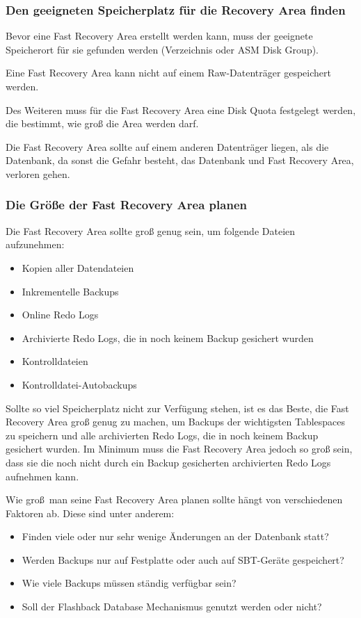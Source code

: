         \subsubsection{Den geeigneten Speicherplatz für die Recovery Area finden}
          Bevor eine Fast Recovery Area erstellt werden kann, muss der geeignete
          Speicherort für sie gefunden werden (Verzeichnis oder ASM Disk
          Group).
\clearpage
          \begin{merke}
            Eine Fast Recovery Area kann nicht auf einem Raw-Datenträger gespeichert werden.
          \end{merke}
          Des Weiteren muss für die Fast Recovery Area eine Disk Quota festgelegt werden, die bestimmt, wie groß die Area werden darf.

          Die Fast Recovery Area sollte auf einem anderen Datenträger liegen, als die Datenbank, da sonst die Gefahr besteht, das Datenbank und Fast Recovery Area, verloren gehen.
        \subsubsection{Die Größe der Fast Recovery Area planen}
          Die Fast Recovery Area sollte groß genug sein, um folgende Dateien aufzunehmen:
          \begin{itemize}
            \item Kopien aller Datendateien
            \item Inkrementelle Backups
            \item Online Redo Logs
            \item Archivierte Redo Logs, die in noch keinem Backup gesichert wurden
            \item Kontrolldateien
            \item Kontrolldatei-Autobackups
          \end{itemize}
          Sollte so viel Speicherplatz nicht zur Verfügung stehen, ist es das Beste, die Fast Recovery Area groß genug zu machen, um Backups der wichtigsten Tablespaces zu speichern und alle archivierten Redo Logs, die in noch keinem Backup gesichert wurden. Im Minimum muss die Fast Recovery Area jedoch so groß sein, dass sie die noch nicht durch ein Backup gesicherten archivierten Redo Logs aufnehmen kann.

          \begin{merke}
            Wie groß\ man seine Fast Recovery Area planen sollte hängt von verschiedenen Faktoren ab. Diese sind unter anderem:
            \begin{itemize}
              \item Finden viele oder nur sehr wenige Änderungen an der Datenbank statt?
              \item Werden Backups nur auf Festplatte oder auch auf SBT-Geräte gespeichert?
              \item Wie viele Backups müssen ständig verfügbar sein?
              \item Soll der Flashback Database Mechanismus genutzt werden oder nicht?
            \end{itemize}
          \end{merke}
